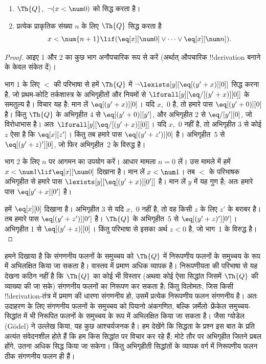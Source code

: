 \documentclass[../../../include/open-logic-section]{subfiles}
\begin{document}
\begin{lem}
\begin{enumerate}
\item $\Th{Q}$,~$\lnot (x < \num 0)$ को सिद्ध करता है।
\item प्रत्येक प्राकृतिक संख्या $n$ के लिए $\Th{Q}$ सिद्ध करता है
\[
x < \num {n+1} \lif (\eq[x][\num 0] \lor \dots \lor \eq[x][\num n]).
\]
\end{enumerate}
\end{lem}

\begin{proof}
आइए 1 और 2 का कुछ भाग अनौपचारिक रूप से करें (अर्थात् औपचारिक
!!{derivation} बनाने के केवल संकेत दें)।

भाग 1 के लिए $<$ की परिभाषा से हमें $\Th{Q}$ में
$\lnot \lexists[y][\eq[(y'+x)][0]]$ सिद्ध करना है, जो प्रथम-कोटि
तर्कशास्त्र के अभिगृहीतों और नियमों से
$\lforall[y][\eq/[(y' + x)][0]]$ के समतुल्य है। विचार यह है: मान लें
$\eq[(y'+x)][0]$। यदि $x$,~0 है, तो हमारे पास
$\eq[(y' + 0)][0]$ है। किंतु $\Th{Q}$ के अभिगृहीत 4 से
$\eq[(y' + 0)][y']$, और अभिगृहीत 2 से $\eq/[y'][0]$, जो विरोधाभास है।
अतः $\lforall[y][\eq/[(y' +x)][0]]$। यदि $x$,~$0$ नहीं है, तो अभिगृहीत 3
से कोई $z$ ऐसा है कि $\eq[x][z']$। किंतु तब हमारे पास
$\eq[(y' + z')][0]$ है। अभिगृहीत~5 से $\eq[(y' + z)'][0]$, जो फिर
अभिगृहीत~2 के विरुद्ध है।

भाग 2 के लिए $n$ पर आगमन का उपयोग करें। आधार मामला $n =0$ लें। उस मामले
में हमें $x < \num 1 \lif \eq[x][\num 0]$ दिखाना है। मान लें
$x < \num 1$। तब $<$ के परिभाषक अभिगृहीत से हमारे पास
$\lexists[y][\eq[(y'+x)][0']]$ है। मान लें $y$ में यह गुण है; अतः हमारे
पास $\eq[y'+x][0']$ है।

हमें $\eq[x][0]$ दिखाना है। अभिगृहीत 3 से यदि $x$,~0 नहीं है, तो वह
किसी $z$ के लिए $z'$ के बराबर है। तब हमारे पास
$\eq[(y' + z')][0']$ है। $\Th{Q}$ के अभिगृहीत~5 से
$\eq[(y'+z)'][0']$। अभिगृहीत 1 से $\eq[(y' + z)][0]$। किंतु परिभाषा से
इसका अर्थ $z < 0$ है, जो भाग~1 के विरुद्ध है।
\end{proof}

\begin{explain}
हमने दिखाया है कि संगणनीय फलनों के समुच्चय को $\Th{Q}$ में निरूपणीय फलनों
के समुच्चय के रूप में अभिलक्षित किया जा सकता है। वास्तव में प्रमाण अधिक
व्यापक है। निरूपणीयता की परिभाषा से यह देखना कठिन नहीं है कि $\Th{Q}$ का
कोई भी विस्तार (अथवा कोई ऐसा सिद्धांत जिसमें $\Th{Q}$ की व्याख्या की जा
सके) संगणनीय फलनों का निरूपण कर सकता है; किंतु विलोमतः, जिस किसी
!!{derivation}-तंत्र में प्रमाण की धारणा संगणनीय हो, उसमें प्रत्येक निरूपणीय
फलन संगणनीय है। अतः उदाहरण के लिए संगणनीय फलनों के समुच्चय को पियानो
अंकगणित, बल्कि ज़र्मेलो--फ्रेंकेल समुच्चय-सिद्धांत में भी निरूपित फलनों के
समुच्चय के रूप में अभिलक्षित किया जा सकता है। जैसा ग्योडेल (G\"odel) ने
उल्लेख किया, यह कुछ आश्चर्यजनक है। हम देखेंगे कि सिद्धता के प्रश्न इस बात
के प्रति अत्यंत संवेदनशील होते हैं कि हम किस सिद्धांत पर विचार कर रहे हैं;
मोटे तौर पर अभिगृहीत जितने प्रबल होंगे, उतना अधिक सिद्ध किया जा सकेगा।
किंतु अभिगृहीती सिद्धांतों के व्यापक वर्ग में निरूपणीय फलन ठीक संगणनीय फलन
ही हैं।
\end{explain}
\end{document}
